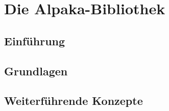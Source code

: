 \chapter{Die Alpaka-Bibliothek}\label{alpaka}

\section{Einführung}\label{alpaka:intro}

\section{Grundlagen}\label{alpaka:grundlagen}

\section{Weiterführende Konzepte}\label{alpaka:struktur}
